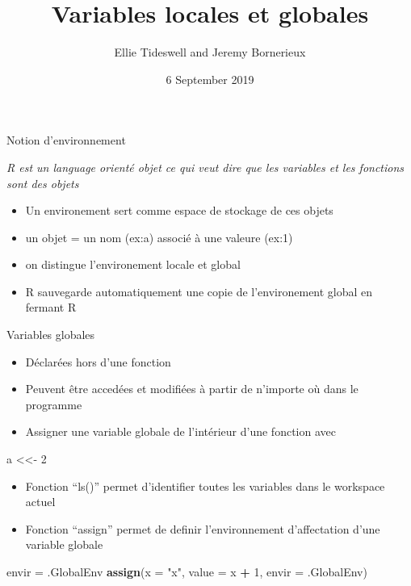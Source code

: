 \documentclass[
  ignorenonframetext,
]{beamer}
\title{Variables locales et globales}
\author{Ellie Tideswell and Jeremy Bornerieux}
\date{6 September 2019}
\newenvironment{Shaded}{\begin{snugshade}}{\end{snugshade}}
\newcommand{\DataTypeTok}[1]{\textcolor[rgb]{0.13,0.29,0.53}{#1}}
\newcommand{\DecValTok}[1]{\textcolor[rgb]{0.00,0.00,0.81}{#1}}
\newcommand{\KeywordTok}[1]{\textcolor[rgb]{0.13,0.29,0.53}{\textbf{#1}}}
\newcommand{\NormalTok}[1]{#1}
\newcommand{\OperatorTok}[1]{\textcolor[rgb]{0.81,0.36,0.00}{\textbf{#1}}}
\newcommand{\StringTok}[1]{\textcolor[rgb]{0.31,0.60,0.02}{#1}}
\providecommand{\tightlist}{%
  \setlength{\itemsep}{0pt}\setlength{\parskip}{0pt}}
\begin{document}
\frame{\titlepage}

\begin{frame}{Notion d'environnement}
\protect\hypertarget{notion-denvironnement}{}

\emph{R est un language orienté objet ce qui veut dire que les variables
et les fonctions sont des objets}

\begin{itemize}
\tightlist
\item
  Un environement sert comme espace de stockage de ces objets
\item
  un objet = un nom (ex:a) associé à une valeure (ex:1)
\item
  on distingue l'environement locale et global
\item
  R sauvegarde automatiquement une copie de l'environement global en
  fermant R
\end{itemize}

\end{frame}

\begin{frame}[fragile]{Variables globales}
\protect\hypertarget{variables-globales}{}

\begin{itemize}
\tightlist
\item
  Déclarées hors d'une fonction
\item
  Peuvent être accedées et modifiées à partir de n'importe où dans le
  programme
\item
  Assigner une variable globale de l'intérieur d'une fonction avec
\end{itemize}

\begin{Shaded}
\begin{Highlighting}[]
\NormalTok{a <<-}\StringTok{ }\DecValTok{2}
\end{Highlighting}
\end{Shaded}

\begin{itemize}
\tightlist
\item
  Fonction ``ls()'' permet d'identifier toutes les variables dans le
  workspace actuel
\item
  Fonction ``assign'' permet de definir l'environnement d'affectation
  d'une variable globale
\end{itemize}

\begin{Shaded}
\begin{Highlighting}[]
\NormalTok{       envir =}\StringTok{ }\NormalTok{.GlobalEnv}
        \KeywordTok{assign}\NormalTok{(}\DataTypeTok{x =} \StringTok{"x"}\NormalTok{, }
        \DataTypeTok{value =}\NormalTok{ x }\OperatorTok{+}\StringTok{ }\DecValTok{1}\NormalTok{, }
        \DataTypeTok{envir =}\NormalTok{ .GlobalEnv)}
\end{Highlighting}
\end{Shaded}

\end{frame}
\end{document}
